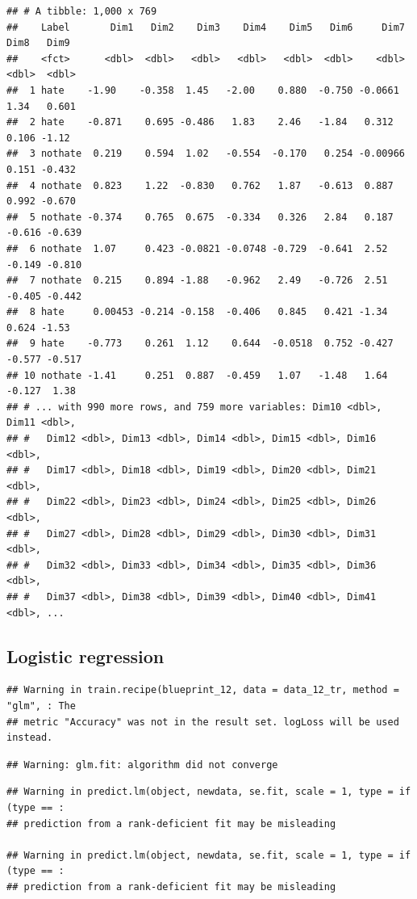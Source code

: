 \documentclass[
  english,
  man]{apa6}
\begin{document}
\begin{verbatim}
## # A tibble: 1,000 x 769
##    Label       Dim1   Dim2    Dim3    Dim4    Dim5   Dim6     Dim7   Dim8   Dim9
##    <fct>      <dbl>  <dbl>   <dbl>   <dbl>   <dbl>  <dbl>    <dbl>  <dbl>  <dbl>
##  1 hate    -1.90    -0.358  1.45   -2.00    0.880  -0.750 -0.0661   1.34   0.601
##  2 hate    -0.871    0.695 -0.486   1.83    2.46   -1.84   0.312    0.106 -1.12 
##  3 nothate  0.219    0.594  1.02   -0.554  -0.170   0.254 -0.00966  0.151 -0.432
##  4 nothate  0.823    1.22  -0.830   0.762   1.87   -0.613  0.887    0.992 -0.670
##  5 nothate -0.374    0.765  0.675  -0.334   0.326   2.84   0.187   -0.616 -0.639
##  6 nothate  1.07     0.423 -0.0821 -0.0748 -0.729  -0.641  2.52    -0.149 -0.810
##  7 nothate  0.215    0.894 -1.88   -0.962   2.49   -0.726  2.51    -0.405 -0.442
##  8 hate     0.00453 -0.214 -0.158  -0.406   0.845   0.421 -1.34     0.624 -1.53 
##  9 hate    -0.773    0.261  1.12    0.644  -0.0518  0.752 -0.427   -0.577 -0.517
## 10 nothate -1.41     0.251  0.887  -0.459   1.07   -1.48   1.64    -0.127  1.38 
## # ... with 990 more rows, and 759 more variables: Dim10 <dbl>, Dim11 <dbl>,
## #   Dim12 <dbl>, Dim13 <dbl>, Dim14 <dbl>, Dim15 <dbl>, Dim16 <dbl>,
## #   Dim17 <dbl>, Dim18 <dbl>, Dim19 <dbl>, Dim20 <dbl>, Dim21 <dbl>,
## #   Dim22 <dbl>, Dim23 <dbl>, Dim24 <dbl>, Dim25 <dbl>, Dim26 <dbl>,
## #   Dim27 <dbl>, Dim28 <dbl>, Dim29 <dbl>, Dim30 <dbl>, Dim31 <dbl>,
## #   Dim32 <dbl>, Dim33 <dbl>, Dim34 <dbl>, Dim35 <dbl>, Dim36 <dbl>,
## #   Dim37 <dbl>, Dim38 <dbl>, Dim39 <dbl>, Dim40 <dbl>, Dim41 <dbl>, ...
\end{verbatim}

\hypertarget{logistic-regression}{%
\subsection{Logistic regression}\label{logistic-regression}}

\begin{verbatim}
## Warning in train.recipe(blueprint_12, data = data_12_tr, method = "glm", : The
## metric "Accuracy" was not in the result set. logLoss will be used instead.
\end{verbatim}

\begin{verbatim}
## Warning: glm.fit: algorithm did not converge
\end{verbatim}

\begin{verbatim}
## Warning in predict.lm(object, newdata, se.fit, scale = 1, type = if (type == :
## prediction from a rank-deficient fit may be misleading

## Warning in predict.lm(object, newdata, se.fit, scale = 1, type = if (type == :
## prediction from a rank-deficient fit may be misleading
\end{verbatim}
\end{document}
